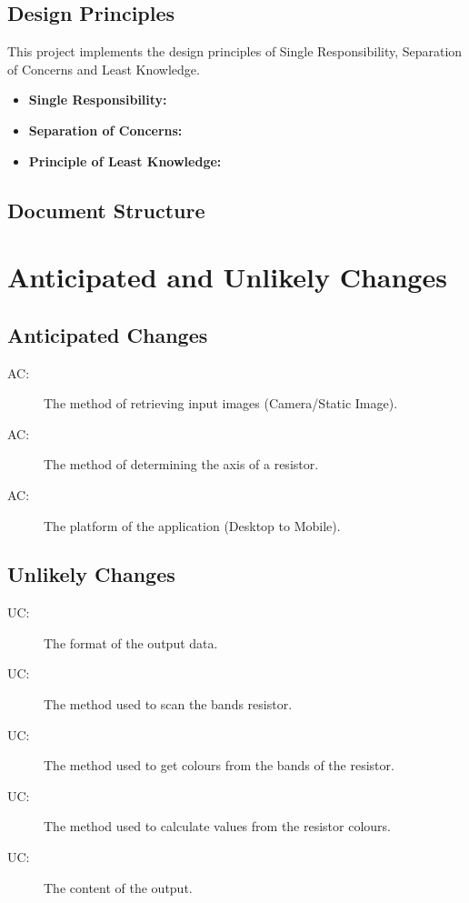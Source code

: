 \documentclass[12pt, titlepage]{article}
\newcounter{acnum}
\newcommand{\actheacnum}{AC\theacnum}
\newcounter{ucnum}
\newcommand{\uctheucnum}{UC\theucnum}
\begin{document}
\subsection{Design Principles}
This project implements the design principles of Single Responsibility, Separation of Concerns and Least Knowledge.
\begin{itemize}
\item \textbf{Single Responsibility:} 
\item \textbf{Separation of Concerns:}
\item \textbf{Principle of Least Knowledge:}
\end{itemize}

\subsection{Document Structure}


\section{Anticipated and Unlikely Changes} \label{SecChange}

\subsection{Anticipated Changes} \label{SecAchange}
\begin{description}
\item[ \actheacnum \label{acInput}:] The method of retrieving input images (Camera/Static Image).
\item[ \actheacnum \label{acAxis}:] The method of determining the axis of a resistor.
\item[ \actheacnum \label{acPlatform}:] The platform of the application (Desktop to Mobile).
\end{description}

\subsection{Unlikely Changes} \label{SecUchange}
\begin{description}
\item[ \uctheucnum \label{ucIO}:] The format of the output data.
\item[ \uctheucnum \label{ucInput}:] The method used to scan the bands resistor.
\item[ \uctheucnum \label{ucInput}:] The method used to get colours from the bands of the resistor.
\item[ \uctheucnum \label{ucInput}:] The method used to calculate values from the resistor colours.
\item[ \uctheucnum \label{ucInput}:] The content of the output.
\end{description}
\end{document}
